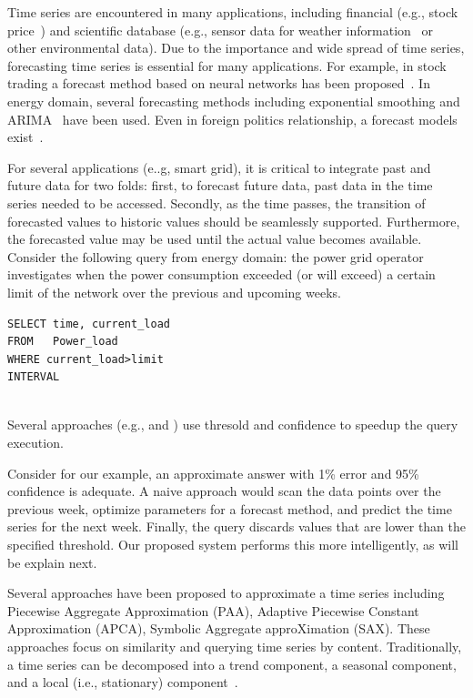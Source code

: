
Time series are encountered in many applications, including financial (e.g., stock price~\cite{stock}) and scientific database (e.g.,
sensor data for weather information~\cite{arimaEng} or other environmental data).
Due to the importance and wide spread of time series,  forecasting time series is essential for  many applications. For example, in stock trading a forecast method based on  neural networks  has been proposed~\cite{stock}.
In energy domain, several forecasting methods including exponential smoothing \cite{} and ARIMA~\cite{tBOX76a} have been used.
Even in foreign politics relationship, a forecast models exist~\cite{iran}.

For several applications (e..g, smart grid),  it is  critical to integrate past and future data for two folds: first,  to forecast future data, past data in the time series needed to be accessed. Secondly, as the time passes, the transition of forecasted values to historic values should be seamlessly supported. Furthermore, the forecasted value  may be used until the actual value becomes available.   Consider the following query from  energy domain: the power grid operator investigates when the power consumption exceeded (or will exceed) a certain limit of the network  over the previous and upcoming weeks. 
\begin{verbatim}
SELECT time, current_load
FROM   Power_load
WHERE current_load>limit
INTERVAL 
      
\end{verbatim}
Several approaches (e.g.,\cite{AG99} and \cite{KML10}) use thresold and confidence to speedup the query execution. 

Consider for our example, an approximate answer with 1\% error  and 95\% confidence is adequate. A naive approach would scan the data points over the previous week, optimize parameters for a forecast method, and predict the time series for the next week. Finally, the query discards values that are lower than the specified threshold. Our proposed system performs this more intelligently, as will be explain next. 

Several approaches have been proposed to approximate a time series including Piecewise Aggregate Approximation (PAA), Adaptive Piecewise Constant Approximation (APCA),  Symbolic Aggregate approXimation (SAX). These approaches focus on similarity and querying time series by content.
Traditionally, a time series  can be decomposed into a trend component, a seasonal component, and a local (i.e., stationary) component~\cite{Decompose}. 

